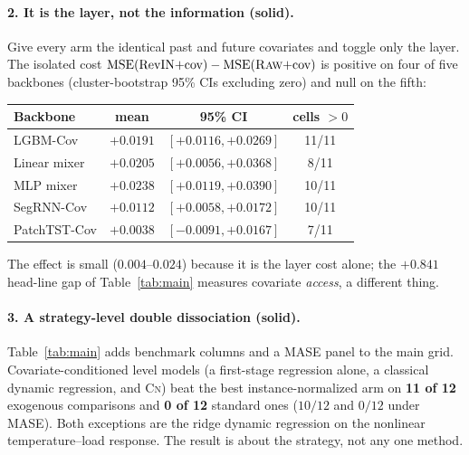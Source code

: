 \documentclass{article}
\newcommand{\mse}{\ensuremath{\mathrm{MSE}}}
\newcommand{\rawm}{\textsc{Raw}}
\newcommand{\cnm}{\textsc{Cn}}
\newcommand{\good}{\textcolor{green!55!black}{\textbf{solid}}}
\begin{document}
\paragraph{2. It is the layer, not the information (\good).}
Give every arm the identical past and future covariates and toggle only the
layer. The isolated cost $\mse(\text{RevIN}{+}\text{cov})-\mse(\rawm{+}\text{cov})$
is positive on four of five backbones (cluster-bootstrap 95\% CIs excluding
zero) and null on the fifth:
\begin{center}\small
\begin{tabular}{lccc}
\toprule
Backbone & mean & 95\% CI & cells $>0$ \\
\midrule
LGBM-Cov & $+0.0191$ & $[+0.0116,+0.0269]$ & 11/11 \\
Linear mixer & $+0.0205$ & $[+0.0056,+0.0368]$ & 8/11 \\
MLP mixer & $+0.0238$ & $[+0.0119,+0.0390]$ & 10/11 \\
SegRNN-Cov & $+0.0112$ & $[+0.0058,+0.0172]$ & 10/11 \\
PatchTST-Cov & $+0.0038$ & $[-0.0091,+0.0167]$ & 7/11 \\
\bottomrule
\end{tabular}
\end{center}
The effect is small ($0.004$--$0.024$) because it is the layer cost alone; the
$+0.841$ head-line gap of Table~\ref{tab:main} measures covariate \emph{access},
a different thing.

\paragraph{3. A strategy-level double dissociation (\good).}
Table~\ref{tab:main} adds benchmark columns and a MASE panel to the main grid.
Covariate-conditioned level models (a first-stage regression alone, a classical
dynamic regression, and \cnm) beat the best instance-normalized arm on
\textbf{11 of 12} exogenous comparisons and \textbf{0 of 12} standard ones
($10/12$ and $0/12$ under MASE). Both exceptions are the ridge dynamic
regression on the nonlinear temperature--load response. The result is about the
strategy, not any one method.
\end{document}
